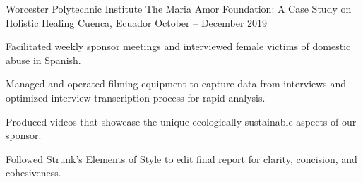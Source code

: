 \begin{cventries}
  \cventry
    {Worcester Polytechnic Institute} %
    {The Maria Amor Foundation: A Case Study on Holistic Healing} %
    {Cuenca, Ecuador} %
    {October – December 2019} %
    {
      \begin{cvitems} %
        \item {Facilitated weekly sponsor meetings and interviewed female victims of domestic abuse in Spanish.}
        \item {Managed and operated filming equipment to capture data from
        interviews and optimized interview transcription process for rapid analysis.}
        \item {Produced videos that showcase the unique ecologically sustainable aspects of our sponsor.}
        \item {Followed
        Strunk’s Elements of Style to edit final report for clarity, concision, and cohesiveness.}
      \end{cvitems}
    }

\end{cventries}
